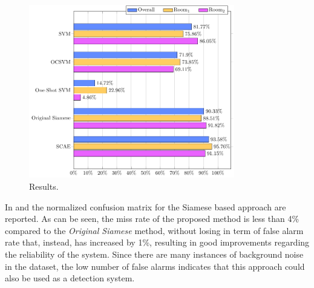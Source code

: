 \begin{figure}[h!]
	\centering
	\includegraphics[width=0.8\textwidth]{img/eeai/results_f1/results_f1}
	\caption[]
	{Results.} 
	\label{fig:results}
\end{figure}
In  and  the normalized confusion matrix for the Siamese based approach are reported. As can be seen, the miss rate of the proposed method is less than 4\% compared to the \textit{Original Siamese} method, without losing in term of false alarm rate that, instead, has increased by 1\%, resulting in good improvements regarding the reliability of the system. Since there are many instances of background noise in the dataset, the low number of false alarms indicates that this approach could also be used as a detection system.

